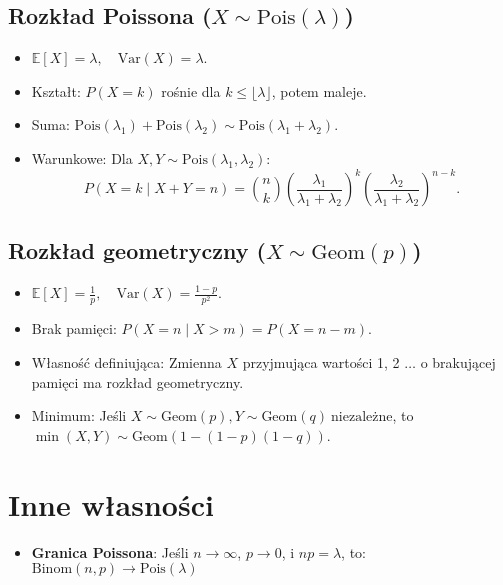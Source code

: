 \documentclass{article}
\theoremstyle{definition}
\theoremstyle{remark}
\begin{document}
\begin{multicols}{2}
    \subsection*{Rozkład Poissona (\( X \sim \text{Pois}(\lambda) \))}
    \begin{itemize}[itemsep=0pt, left=0pt]
        \item \(\mathbb{E}[X] = \lambda, \quad \text{Var}(X) = \lambda\).
        \item Kształt: \( P(X=k) \) rośnie dla \( k \leq \lfloor \lambda \rfloor \), potem maleje.
        \item Suma: \( \text{Pois}(\lambda_1) + \text{Pois}(\lambda_2) \sim \text{Pois}(\lambda_1+\lambda_2) \).
        \item Warunkowe: Dla \( X, Y \sim \text{Pois}(\lambda_1, \lambda_2) \):
        \[
        P(X=k \mid X+Y=n) = \binom{n}{k} \left(\frac{\lambda_1}{\lambda_1+\lambda_2}\right)^k \left(\frac{\lambda_2}{\lambda_1+\lambda_2}\right)^{n-k}.
        \]
    \end{itemize}
    
    \subsection*{Rozkład geometryczny (\( X \sim \text{Geom}(p) \))}
    \begin{itemize}[itemsep=0pt, left=0pt]
        \item \(\mathbb{E}[X] = \frac{1}{p}, \quad \text{Var}(X) = \frac{1-p}{p^2}\).
        \item Brak pamięci: \( P(X=n \mid X>m) = P(X=n-m) \).
        \item Własność definiująca: Zmienna \( X \) przyjmująca wartości 1, 2 \(\ldots\)  o brakującej pamięci ma rozkład geometryczny.
        \item Minimum: Jeśli \( X \sim \text{Geom}(p), Y \sim \text{Geom}(q) \ \text{niezależne} \), to \( \min(X, Y) \sim \text{Geom}(1-(1-p)(1-q)) \).
    \end{itemize}
    
    \section*{Inne własności}
    \begin{itemize}
    
    \item \textbf{Granica Poissona}: Jeśli \( n \to \infty \), \( p \to 0 \), i \( np = \lambda \), to: \(\text{Binom}(n, p) \to \text{Pois}(\lambda)\)
    

\end{itemize}
\end{multicols}
\end{document}
